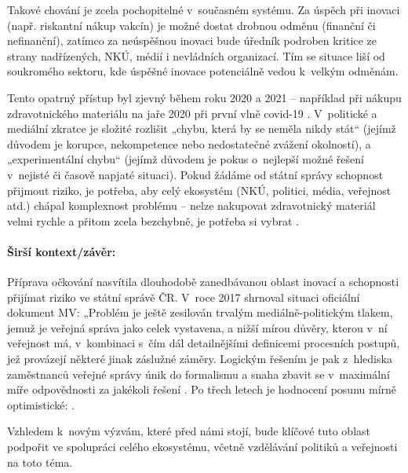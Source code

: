 Takové chování je zcela pochopitelné v~současném systému. Za úspěch při inovaci (např. riskantní nákup vakcín) je možné dostat drobnou odměnu (finanční či nefinanční), zatímco za neúspěšnou inovaci bude úředník podroben kritice ze strany nadřízených, NKÚ, médií i nevládních organizací. Tím se situace liší od soukromého sektoru, kde úspěšné inovace potenciálně vedou k~velkým odměnám.

Tento opatrný přístup byl zjevný během roku 2020 a 2021 -- například při nákupu zdravotnického materiálu na jaře 2020 při první vlně covid-19 \cite{nejvyssi_kontrolni_urad_stat_2021}. V~politické a mediální zkratce je složité rozlišit „chybu, která by se neměla nikdy stát“ (jejímž důvodem je korupce, nekompetence nebo nedostatečné zvážení okolností), a „experimentální chybu“ (jejímž důvodem je pokus o~nejlepší možné řešení v~nejisté či časově napjaté situaci). Pokud žádáme od státní správy schopnost přijmout riziko, je potřeba, aby celý ekosystém (NKÚ, politici, média, veřejnost atd.) chápal komplexnost problému -- nelze nakupovat zdravotnický materiál velmi rychle a přitom zcela bezchybně, je potřeba si vybrat \cite{noauthor_how_2020}.

\paragraph{Širší kontext/závěr:} Příprava očkování nasvítila dlouhodobě zanedbávanou oblast inovací a schopnosti přijímat riziko ve státní správě ČR. V~roce 2017 shrnoval situaci oficiální dokument MV: „Problém je ještě zesilován trvalým mediálně-politickým tlakem, jemuž je veřejná správa jako celek vystavena, a nižší mírou důvěry, kterou v~ní veřejnost má, v~kombinaci s~čím dál detailnějšími definicemi procesních postupů, jež provázejí některé jinak záslužné záměry. Logickým řešením je pak z~hlediska zaměstnanců veřejné správy únik do formalismu a snaha zbavit se v~maximální míře odpovědnosti za jakékoli řešení \cite{pg:polasek2016}. Po třech letech je hodnocení posunu mírně optimistické:  \cite{ministerstvo_pro_mistni_rozvoj_cr_ministerstvo_2020}.

Vzhledem k~novým výzvám, které před námi stojí, bude klíčové tuto oblast
podpořit ve spolupráci celého ekosystému, včetně vzdělávání politiků a
veřejnosti na toto téma.

